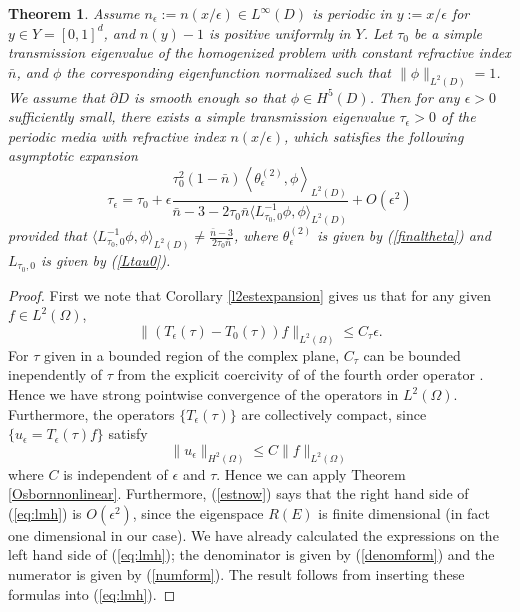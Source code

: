 \documentclass[12pt]{article}
\newtheorem{theorem}{Theorem}
\begin{document}
\begin{theorem}
 Assume $n_\epsilon:=n(x/\epsilon)\in L^\infty(D)$ is periodic in $y:=x/\epsilon$ for $y\in Y= [0,1]^d$, and  $n(y)-1$ is positive uniformly in $Y$. Let $\tau_0$ be a simple transmission eigenvalue of the homogenized problem with constant refractive index $\bar n$, and $\phi$ the corresponding eigenfunction normalized such that $\|\phi\|_{L^2(D)}=1$. We assume that $\partial D$ is smooth enough so that $\phi\in H^5(D)$. Then for any $\epsilon>0$ sufficiently small, there exists a simple transmission eigenvalue $\tau_\epsilon>0$ of the periodic media with refractive index $n(x/\epsilon)$, which satisfies the following asymptotic expansion
 \begin{equation}\label{correctedeig}
 \tau_\epsilon=\tau_0+\epsilon\frac{\tau_0^2(1-\bar n)\left<\theta_\epsilon^{(2)}, \phi\right>_{L^2(D)}}{\bar n-3-2\tau_0\bar n \langle L^{-1}_{\tau_0,0}\phi,\phi\rangle_{L^2(D)}}+O(\epsilon^2)
 \end{equation} provided that $\langle L^{-1}_{\tau_0,0}\phi,\phi\rangle_{L^2(D)}\neq \frac{\bar n-3}{2\tau_0\bar n}$,  where $\theta_\epsilon^{(2)}$ is given by (\ref{finaltheta}) and $L_{\tau_0,0}$ is given by (\ref{Ltau0}).
\end{theorem}
\begin{proof}
First we note that Corollary  \ref{l2estexpansion} gives us that for any given $f\in L^2(\Omega)$, \begin{equation} \label{estnow} \| (T_\epsilon(\tau) - T_0(\tau) ) f \|_{L^2(\Omega)} \leq C_\tau \epsilon.\end{equation}  For $\tau$ given in a bounded region of the complex plane, $C_\tau$ can be bounded inependently of $\tau$  from the explicit coercivity of of the fourth order operator \cite{CaHa}. Hence we have strong pointwise convergence of the operators in $L^2(\Omega)$. Furthermore, the operators $\{ T_\epsilon (\tau) \} $ are collectively compact, since $\{ u_\epsilon= T_\epsilon (\tau) f \} $ satisfy $$ \| u_\epsilon \|_{H^2(\Omega)} \leq C \| f\|_{L^2(\Omega)} $$ where $C$ is independent of $\epsilon$ and $\tau$. Hence we can apply Theorem \ref{Osbornnonlinear}. Furthermore, (\ref{estnow}) says that the right hand side of (\ref{eq:lmh}) is $O(\epsilon^2)$, since the eigenspace $R(E)$ is finite dimensional (in fact one dimensional in our case).  We have already calculated the expressions on the left hand side of (\ref{eq:lmh}); the denominator is given by (\ref{denomform}) and the numerator is given by (\ref{numform}).  The result follows from inserting these formulas into (\ref{eq:lmh}). 
\end{proof}
\end{document}
